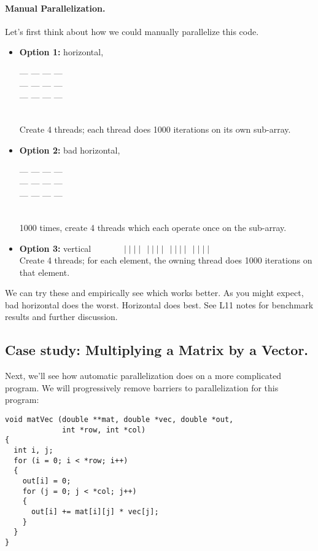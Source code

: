 \paragraph{Manual Parallelization.} Let's first think about how we could 
manually parallelize this code.
\begin{itemize}
\item {\bf Option 1:} horizontal, \begin{minipage}{7em} --- --- --- ---\\[-.8em] --- --- --- ---\\[-.8em] --- --- --- --- \end{minipage} \\
Create 4 threads; each thread does 1000 iterations on its own sub-array.

\item {\bf Option 2:} bad horizontal, \begin{minipage}{7em} --- --- --- ---\\[-.8em] --- --- --- ---\\[-.8em] --- --- --- --- \end{minipage} \\
1000 times, create 4 threads which each operate once on the sub-array.

\item {\bf Option 3:} vertical $ \quad \: \qquad \mid \mid \mid\mid \:\: \mid \mid \mid \mid \:\: \mid \mid \mid \mid\:\: \mid \mid \mid \mid$\\
Create 4 threads; for each element, the owning thread does 1000 iterations on that element.
\end{itemize}
We can try these and empirically see which works better. As you might expect, bad horizontal
does the worst. Horizontal does best. See L11 notes for benchmark results and further discussion.

\subsection*{Case study: Multiplying a Matrix by a Vector.}
Next, we'll see how automatic parallelization does on a more complicated
program. We will progressively remove barriers to parallelization for
this program:

\begin{verbatim}
void matVec (double **mat, double *vec, double *out,
             int *row, int *col) 
{
  int i, j;
  for (i = 0; i < *row; i++)
  {
    out[i] = 0;
    for (j = 0; j < *col; j++)
    {
      out[i] += mat[i][j] * vec[j];
    }
  }
}
\end{verbatim}

